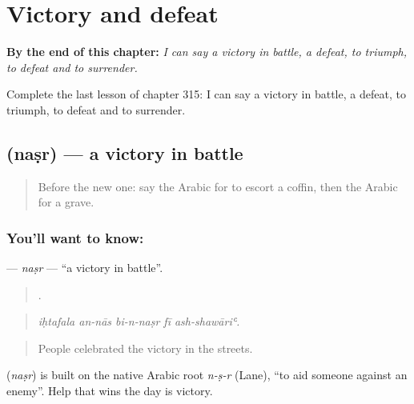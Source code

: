 
\chapter{Victory and defeat}
\label{ch:ar-victory-and-defeat}

\begin{chapteropening}
\textbf{By the end of this chapter:} \emph{I can say a victory in battle, a defeat, to triumph, to defeat and to surrender.}

Complete the last lesson of chapter 315: I can say a victory in battle, a defeat, to triumph, to defeat and to surrender.
\end{chapteropening}

\section[\texorpdfstring{\ar{نصر} (naṣr)}{نصر (naṣr)}]{ (naṣr) — a victory in battle}

\label{lesson:AR-C315-nasr}



\begin{quote}
Before the new one: say the Arabic for to escort a coffin, then the Arabic for a grave.
\end{quote}

\subsection*{You'll want to know: }
\textbf{} — \emph{naṣr} — \textquotedblleft{}a victory in battle\textquotedblright{}.

\begin{quote}
    .
\end{quote}

\begin{quote}
\emph{iḥtafala an-nās bi-n-naṣr fī ash-shawāriʿ.}
\end{quote}

\begin{quote}
People celebrated the victory in the streets.
\end{quote}

\begin{cousinweb}
\textbf{} (\emph{naṣr}) is built on the native Arabic root \emph{n-ṣ-r} (Lane), \textquotedblleft{}to aid someone against an enemy\textquotedblright{}. Help that wins the day is victory.
\end{cousinweb}

